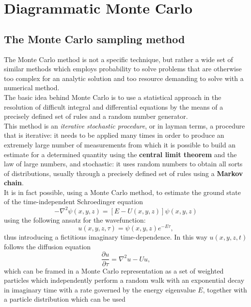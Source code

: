 \section{Diagrammatic Monte Carlo}
\subsection{The Monte Carlo sampling method}
The Monte Carlo method is not a specific technique, but rather a wide set of similar methods which employs probability to solve problems 
that are otherwise too complex for an analytic solution and too resource demanding to solve with a numerical method.\\
The basic idea behind Monte Carlo is to use a statistical approach in the resolution of difficult integral and differential equations 
\cite{metropolis1949monte} by the means of a precisely defined set of rules and a random number generator.\\
This method is an \textit{iterative stochastic procedure}, or in layman terms, a procedure that is iterative: it needs to be applied many times in 
order to produce an extremely large number of measurements from which it is possible to build an estimate for a determined quantity 
using the \textbf{central limit theorem} and the law of large numbers, and stochastic: it uses random numbers to obtain all sorts of distributions, 
usually through a precisely defined set of rules using a \textbf{Markov chain}.\\
It is in fact possible, using a Monte Carlo method, to estimate the ground state of the time-independent Schroedinger equation \cite{benedict2019quantum}
\begin{equation}
    -\nabla^2\psi(x,y,z)=\left[E-U(x,y,z)\right]\psi(x,y,z)
\end{equation}
using the following ansatz for the wavefunction:
\begin{equation}
    u(x,y,z,\tau)=\psi(x,y,z)e^{-E\tau},
\end{equation}
thus introducing a fictitious imaginary time-dependence. In this way $u(x,y,z,t)$ follows the diffusion equation
\begin{equation}
    \frac{\partial u}{\partial \tau}=\nabla^2u-Uu,
\end{equation}
which can be framed in a Monte Carlo representation as a set of weighted particles which independently perform a random walk with an 
exponential decay in imaginary time with a rate governed by the energy eigenvalue $E$, together with a particle distribution which can be used 
